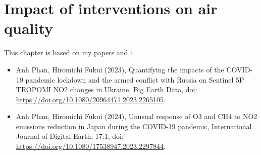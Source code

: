 \chapter{Impact of interventions on air quality} \label{chap3}
\renewcommand{\headrulewidth}{0pt}
\lhead[\thepage]{\rightmark}
\rhead[\rightmark]{\thepage}
\cfoot[]{}
This chapter is based on my papers \citep{aqukrrus2023} and \citep{aqjp2023}:
\begin{itemize}
    \item Anh Phan, Hiromichi Fukui (2023), Quantifying the impacts of the COVID-19 pandemic lockdown and the armed conflict with Russia on Sentinel 5P TROPOMI NO2 changes in Ukraine, Big Earth Data, doi: \url{https://doi.org/10.1080/20964471.2023.2265105}.
    \item Anh Phan, Hiromichi Fukui (2024), Unusual response of O3 and CH4 to NO2 emissions reduction in Japan during the COVID-19 pandemic, International Journal of Digital Earth, 17:1, doi: \url{https://doi.org/10.1080/17538947.2023.2297844}.
\end{itemize}

